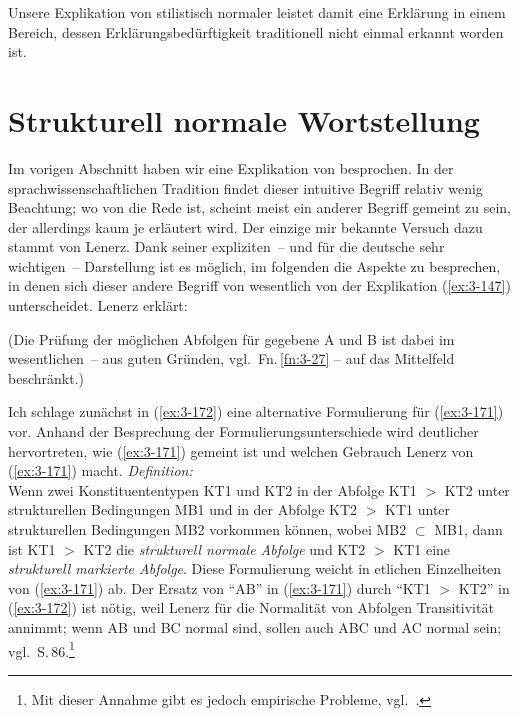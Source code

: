 \documentclass[output=paper]{langsci/langscibook}
\begin{document}
Unsere Explikation von stilistisch normaler  leistet damit
eine Erklärung in einem Bereich, dessen Erklärungsbedürftigkeit
traditionell nicht einmal erkannt worden ist.

\section{Strukturell normale Wortstellung}
\label{sec:3-3}

Im vorigen Abschnitt haben wir eine Explikation von
 besprochen. In der
sprachwissenschaftlichen Tradition findet dieser intuitive Begriff
relativ wenig Beachtung; wo von  die
Rede ist, scheint meist ein anderer Begriff gemeint zu sein, der
allerdings kaum je erläutert wird. Der einzige mir bekannte Versuch
dazu stammt von Lenerz. Dank seiner expliziten~-- und für die deutsche
 sehr wichtigen~-- Darstellung ist es möglich, im folgenden
die Aspekte zu besprechen, in denen sich dieser andere Begriff von
 wesentlich von der Explikation (\ref{ex:3-147})
unterscheidet. Lenerz erklärt:
\begin{exe}
\settowidth{}
 
\end{exe}
(Die Prüfung der möglichen Abfolgen für gegebene A und B ist dabei im
wesentlichen~-- aus guten Gründen, vgl.\ Fn.\,\ref{fn:3-27} -- auf das Mittelfeld
beschränkt.)

Ich schlage zunächst in (\ref{ex:3-172}) eine alternative Formulierung für (\ref{ex:3-171})
vor. Anhand der Besprechung der Formulierungsunterschiede wird
deutlicher hervortreten, wie (\ref{ex:3-171}) gemeint ist und welchen Gebrauch
Lenerz von (\ref{ex:3-171}) macht.
\ea
\label{ex:3-172}
\textit{Definition:} \\
Wenn zwei Konstituententypen KT1 und KT2 in der Abfolge KT1 $>$ KT2
unter strukturellen Bedingungen MB1 und in der Abfolge KT2 $>$ KT1 unter
strukturellen Bedingungen MB2 vorkommen können, wobei MB2 $\subset$ MB1, dann
ist KT1 $>$ KT2 die \textit{strukturell normale Abfolge} und KT2 $>$ KT1 eine
\textit{strukturell markierte Abfolge}.
\z
Diese Formulierung weicht in etlichen Einzelheiten von (\ref{ex:3-171}) ab. Der Ersatz von "`AB"' in (\ref{ex:3-171}) durch "`KT1 $>$ KT2"' in (\ref{ex:3-172}) ist nötig, weil
Lenerz für die Normalität von Abfolgen Transitivität annimmt; \dash wenn AB und BC normal sind,
sollen auch ABC und AC normal sein; vgl.\ \zb S.\,86.\footnote{\label{fn:3-31}%
	Mit dieser Annahme
  gibt es jedoch empirische Probleme, vgl.\ \citet[88f]{Lenerz77}.%
} 
\end{document}
